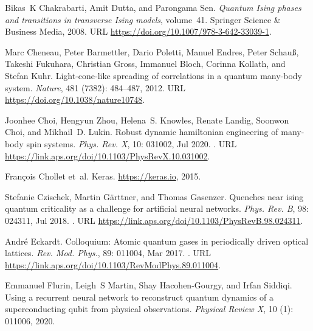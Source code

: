 \documentclass[a4paper,aps,amsmath,amssymb,twocolumn,longbibliography,,accepted=2022-05-17]{quantumarticle}
\begin{document}
\begin{thebibliography}{52}
Bikas~K Chakrabarti, Amit Dutta, and Parongama Sen.
\newblock \emph{Quantum Ising phases and transitions in transverse Ising
  models}, volume~41.
\newblock Springer Science \& Business Media, 2008.
\newblock URL \url{https://doi.org/10.1007/978-3-642-33039-1}.

Marc Cheneau, Peter Barmettler, Dario Poletti, Manuel Endres, Peter Schau{\ss},
  Takeshi Fukuhara, Christian Gross, Immanuel Bloch, Corinna Kollath, and
  Stefan Kuhr.
\newblock Light-cone-like spreading of correlations in a quantum many-body
  system.
\newblock \emph{Nature}, 481 (7382): 484--487, 2012.
\newblock URL \url{https://doi.org/10.1038/nature10748}.

Joonhee Choi, Hengyun Zhou, Helena~S. Knowles, Renate Landig, Soonwon Choi, and
  Mikhail~D. Lukin.
\newblock Robust dynamic hamiltonian engineering of many-body spin systems.
\newblock \emph{Phys. Rev. X}, 10: 031002, Jul 2020.
\newblock {}.
\newblock URL \url{https://link.aps.org/doi/10.1103/PhysRevX.10.031002}.

Fran\c{c}ois Chollet et~al.
\newblock Keras.
\newblock \url{https://keras.io}, 2015.

Stefanie Czischek, Martin G\"arttner, and Thomas Gasenzer.
\newblock Quenches near ising quantum criticality as a challenge for artificial
  neural networks.
\newblock \emph{Phys. Rev. B}, 98: 024311, Jul 2018.
\newblock {}.
\newblock URL \url{https://link.aps.org/doi/10.1103/PhysRevB.98.024311}.

Andr\'e Eckardt.
\newblock Colloquium: Atomic quantum gases in periodically driven optical
  lattices.
\newblock \emph{Rev. Mod. Phys.}, 89: 011004, Mar 2017.
\newblock {}.
\newblock URL \url{https://link.aps.org/doi/10.1103/RevModPhys.89.011004}.

Emmanuel Flurin, Leigh~S Martin, Shay Hacohen-Gourgy, and Irfan Siddiqi.
\newblock Using a recurrent neural network to reconstruct quantum dynamics of a
  superconducting qubit from physical observations.
\newblock \emph{Physical Review X}, 10 (1): 011006, 2020.


\end{thebibliography}
\end{document}
